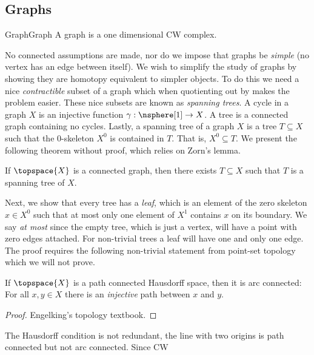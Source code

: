     \subsection{Graphs}
        \begin{fdefinition}{Graph}{Graph}
            A graph is a one dimensional CW complex.
        \end{fdefinition}
        No connected assumptions are made, nor do we impose that graphs
        be \textit{simple} (no vertex has an edge between itself). We
        wish to simplify the study of graphs by showing they are
        homotopy equivalent to simpler objects. To do this we need a
        nice \textit{contractible} subset of a graph which when
        quotienting out by makes the problem easier. These nice subsets
        are known as \textit{spanning trees}. A cycle in a graph $X$ is
        an injective function $\gamma:\nsphere[1]\rightarrow{X}$. A tree
        is a connected graph containing no cycles. Lastly, a spanning
        tree of a graph $X$ is a tree $T\subseteq{X}$ such that the
        0-skeleton $X^{0}$ is contained in $T$. That is,
        $X^{0}\subseteq{T}$. We present the following theorem without
        proof, which relies on Zorn's lemma.
        \begin{theorem}
            If $\topspace{X}$ is a connected graph, then there exists
            $T\subseteq{X}$ such that $T$ is a spanning tree of $X$.
        \end{theorem}
        Next, we show that every tree has a \textit{leaf}, which is an
        element of the zero skeleton $x\in{X}^{0}$ such that at most
        only one element of $X^{1}$ contains $x$ on its boundary. We say
        \textit{at most} since the empty tree, which is just a vertex,
        will have a point with zero edges attached. For non-trivial
        trees a leaf will have one and only one edge. The proof requires
        the following non-trivial statement from point-set topology
        which we will not prove.
        \begin{theorem}
            If $\topspace{X}$ is a path connected Hausdorff space, then
            it is arc connected: For all $x,y\in{X}$ there is an
            \textit{injective} path between $x$ and $y$.
        \end{theorem}
        \begin{proof}
            Engelking's topology textbook.
        \end{proof}
        The Hausdorff condition is not redundant, the line with two
        origins is path connected but not arc connected. Since CW
